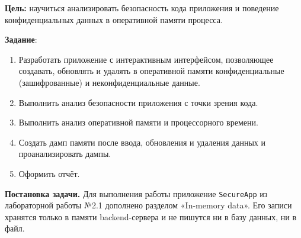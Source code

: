 \textbf{Цель:} научиться анализировать безопасность кода приложения и
поведение конфиденциальных данных в оперативной памяти процесса.

\vspace{1em}

\textbf{Задание}:
\begin{enumerate}
  \item Разработать приложение с интерактивным интерфейсом, позволяющее
  создавать, обновлять и удалять в оперативной памяти конфиденциальные
  (зашифрованные) и неконфиденциальные данные.
  \item Выполнить анализ безопасности приложения с точки зрения кода.
  \item Выполнить анализ оперативной памяти и процессорного времени.
  \item Создать дамп памяти после ввода, обновления и удаления данных
  и проанализировать дампы.
  \item Оформить отчёт.
\end{enumerate}

\textbf{Постановка задачи.} Для выполнения работы приложение
\texttt{SecureApp} из лабораторной работы №2.1 дополнено разделом
«In-memory data». Его записи хранятся только в памяти backend-сервера и
не пишутся ни в базу данных, ни в файл.
